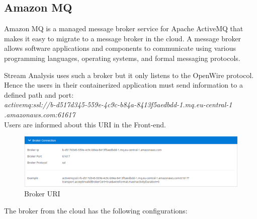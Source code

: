 \newpage

\subsection{Amazon MQ}
\label{chap:04:03:04}

Amazon MQ is a managed message broker service for Apache ActiveMQ that makes it easy to migrate to a message broker in the cloud. A message broker allows software applications and components to communicate using various programming languages, operating systems, and formal messaging protocols.\cite{amazon-mq}

Stream Analysis uses such a broker but it only listens to the OpenWire protocol. Hence the users in their containerized application must send information to a defined path and port:\\ 

\textit{activemq:ssl://b-d517d345-559e-4c9c-b84a-8413f5aedbdd-1.mq.eu-central-1
	.amazonaws.com:61617}\\

Users are informed about this URI in the Front-end.

\begin{figure}[h]
	\centering
	\includegraphics[width=1\linewidth]{./images/webapp/broker.PNG}
	\caption{Broker URI}
	\label{fig:broker}
\end{figure}

The broker from the cloud has the following configurations:

